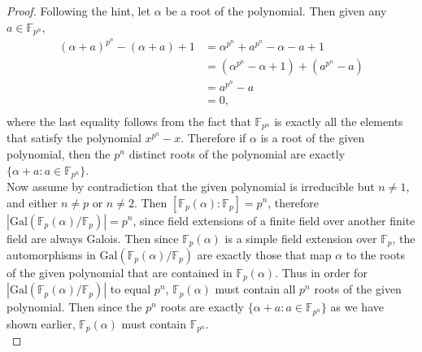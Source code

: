 \documentclass{article}
\begin{document}
  \begin{proof}
    Following the hint, let $\alpha$ be a root of the polynomial. Then
    given any $a\in\mathbb{F}_{p^n}$,
    \begin{align*}
      (\alpha+a)^{p^n}-(\alpha+a)+1 &=\alpha^{p^n}+a^{p^n}-\alpha-a+1\\
      &=(\alpha^{p^n}-\alpha+1)+(a^{p^n}-a)\\
      &=a^{p^n}-a\\
      &=0,\\
    \end{align*}
    where the last equality follows from the fact that $\mathbb{F}_{p^n}$
    is exactly all the elements that satisfy the polynomial $x^{p^n}-x$.
    Therefore if $\alpha$ is a root of the given polynomial, then the $p^n$
    distinct roots of the polynomial are exactly
    $\{\alpha+a:a\in\mathbb{F}_{p^n}\}$. \\

    Now assume by contradiction that the given polynomial is irreducible
    but $n\neq1$, and either $n\neq p$ or $n\neq2$. Then
    $[\mathbb{F}_p(\alpha):\mathbb{F}_p]=p^n$, therefore
    $|\text{Gal}(\mathbb{F}_p(\alpha)/\mathbb{F}_p)|=p^n$, since field
    extensions of a finite field over another finite field are always
    Galois. Then since $\mathbb{F}_p(\alpha)$ is a simple field extension
    over $\mathbb{F}_p$, the automorphisms in
    $\text{Gal}(\mathbb{F}_p(\alpha)/\mathbb{F}_p)$ are exactly those that
    map $\alpha$ to the roots of the given polynomial that are contained in
    $\mathbb{F}_p(\alpha)$. Thus in order for
    $|\text{Gal}(\mathbb{F}_p(\alpha)/\mathbb{F}_p)|$ to equal $p^n$,
    $\mathbb{F}_p(\alpha)$ must contain all $p^n$ roots of the
    given polynomial. Then since the $p^n$ roots are exactly
    $\{\alpha+a:a\in\mathbb{F}_{p^n}\}$ as we have shown earlier,
    $\mathbb{F}_p(\alpha)$ must contain $\mathbb{F}_{p^n}$. \\


\end{proof}
\end{document}
